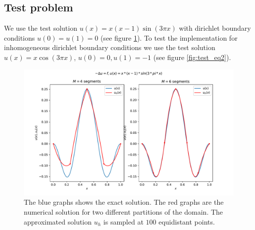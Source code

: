 \subsection{Test problem}

We use the test solution \( u(x) = x(x-1)\sin(3\pi x) \)
with dirichlet boundary conditions \( u(0) = u(1) = 0 \)
(see figure \ref{fig:test_eq1}).
To test the implementation for inhomogeneous dirichlet boundary conditions
we use the test solution \( u(x) = x \cos(3\pi x) \), \( u(0) = 0, u(1) = -1 \)
(see figure \ref{fig:test_eq2}).

\begin{figure}
  \centering
  \includegraphics[width=\textwidth]{Images/plots/task1_test_sol1.pdf}
  \caption{The blue graphs shows the exact solution.
  The red graphs are the numerical solution for two
different partitions of the domain.
The approximated solution \( u_h \) is sampled at \( 100 \)
equidistant points.}
  \label{fig:test_eq1}
\end{figure}

